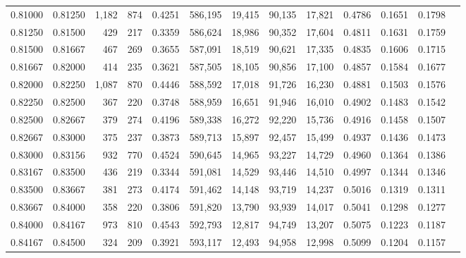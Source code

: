 \begin{tabular}{rrrrrrrrrrrrr}
0.81000 & 0.81250 & 1,182 & 874 &                                     0.4251 & 586,195 &  19,415 &  90,135 &  17,821 & 0.4786 & 0.1651 & 0.1798 \\
0.81250 & 0.81500 &   429 & 217 &                                     0.3359 & 586,624 &  18,986 &  90,352 &  17,604 & 0.4811 & 0.1631 & 0.1759 \\
0.81500 & 0.81667 &   467 & 269 &                                     0.3655 & 587,091 &  18,519 &  90,621 &  17,335 & 0.4835 & 0.1606 & 0.1715 \\
0.81667 & 0.82000 &   414 & 235 &                                     0.3621 & 587,505 &  18,105 &  90,856 &  17,100 & 0.4857 & 0.1584 & 0.1677 \\
0.82000 & 0.82250 & 1,087 & 870 &                                     0.4446 & 588,592 &  17,018 &  91,726 &  16,230 & 0.4881 & 0.1503 & 0.1576 \\
0.82250 & 0.82500 &   367 & 220 &                                     0.3748 & 588,959 &  16,651 &  91,946 &  16,010 & 0.4902 & 0.1483 & 0.1542 \\
0.82500 & 0.82667 &   379 & 274 &                                     0.4196 & 589,338 &  16,272 &  92,220 &  15,736 & 0.4916 & 0.1458 & 0.1507 \\
0.82667 & 0.83000 &   375 & 237 &                                     0.3873 & 589,713 &  15,897 &  92,457 &  15,499 & 0.4937 & 0.1436 & 0.1473 \\
0.83000 & 0.83156 &   932 & 770 &                                     0.4524 & 590,645 &  14,965 &  93,227 &  14,729 & 0.4960 & 0.1364 & 0.1386 \\
0.83167 & 0.83500 &   436 & 219 &                                     0.3344 & 591,081 &  14,529 &  93,446 &  14,510 & 0.4997 & 0.1344 & 0.1346 \\
0.83500 & 0.83667 &   381 & 273 &                                     0.4174 & 591,462 &  14,148 &  93,719 &  14,237 & 0.5016 & 0.1319 & 0.1311 \\
0.83667 & 0.84000 &   358 & 220 &                                     0.3806 & 591,820 &  13,790 &  93,939 &  14,017 & 0.5041 & 0.1298 & 0.1277 \\
0.84000 & 0.84167 &   973 & 810 &                                     0.4543 & 592,793 &  12,817 &  94,749 &  13,207 & 0.5075 & 0.1223 & 0.1187 \\
0.84167 & 0.84500 &   324 & 209 &                                     0.3921 & 593,117 &  12,493 &  94,958 &  12,998 & 0.5099 & 0.1204 & 0.1157 \\

\end{tabular}
